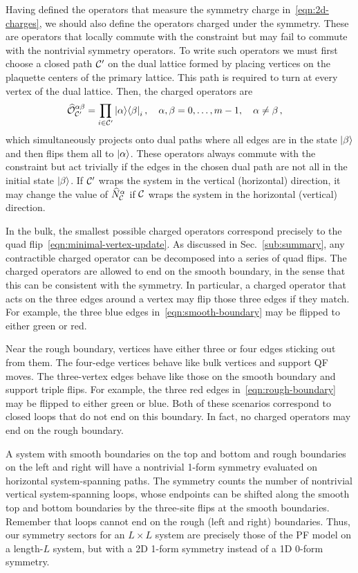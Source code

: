 Having defined the operators that measure the symmetry charge in~\eqref{eqn:2d-charges}, we should also define the operators charged under the symmetry. These are operators that locally commute with the constraint but may fail to commute with the nontrivial symmetry operators. To write such operators we must first choose a closed path $\cal{C}'$ on the dual lattice formed by placing vertices on the plaquette centers of the primary lattice. This path is required to turn at every vertex of the dual lattice. 
Then, the charged operators are 
\begin{align}
\hat{\cal{O}}_{\cal{C}'}^{\alpha\beta} &= \prod_{i \in \cal{C}'} \ketbra{\alpha}{\beta}_i, \quad \alpha, \beta = 0,\dots,m-1, \quad \alpha \ne \beta\, ,
\end{align}
which simultaneously projects onto dual paths where all edges are in the state $\ket{\beta}$ and then flips them all to $\ket{\alpha}$. These operators always commute with the constraint but act trivially if the edges in the chosen dual path are not all in the initial state $\ket{\beta}$. If $\cal{C}'$ wraps the system in the vertical (horizontal) direction, it may change the value of $\hat{N}^\alpha_\cal{C}$ if $\cal{C}$ wraps the system in the horizontal (vertical) direction.

In the bulk, the smallest possible charged operators correspond precisely to the quad flip~\eqref{eqn:minimal-vertex-update}. As discussed in Sec.~\ref{sub:summary}, any contractible charged operator can be decomposed into a series of quad flips.
The charged operators are allowed to end on the smooth boundary, in the sense that this can be consistent with the symmetry. In particular, a charged operator that acts on the three edges around a vertex may flip those three edges if they match. For example, the three blue edges in~\eqref{eqn:smooth-boundary} may be flipped to either green or red.

Near the rough boundary, vertices have either three or four edges sticking out from them. The four-edge vertices behave like bulk vertices and support QF moves. The three-vertex edges behave like those on the smooth boundary and support triple flips. For example, the three red edges in~\eqref{eqn:rough-boundary} may be flipped to either green or blue. Both of these scenarios correspond to closed loops that do not end on this boundary. In fact, no charged operators may end on the rough boundary.

A system with smooth boundaries on the top and bottom and rough boundaries on the left and right will have a nontrivial 1-form symmetry evaluated on horizontal system-spanning paths. The symmetry counts the number of nontrivial vertical system-spanning loops, whose endpoints can be shifted along the smooth top and bottom boundaries by the three-site flips at the smooth boundaries. Remember that loops cannot end on the rough (left and right) boundaries. Thus, our symmetry sectors for an $L\times L$ system are precisely those of the PF model on a length-$L$ system, but with a 2D 1-form symmetry instead of a 1D 0-form symmetry.

